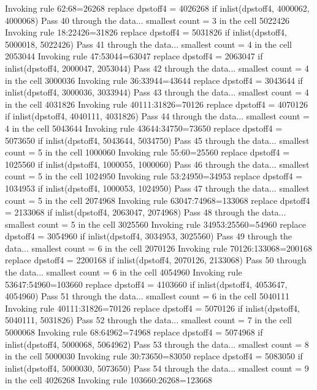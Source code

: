   Invoking rule 62:68=26268
  replace dpstoff4 = 4026268 if inlist(dpstoff4, 4000062, 4000068)
Pass 40 through the data...
  smallest count = 3 in the cell      5022426
  Invoking rule 18:22426=31826
  replace dpstoff4 = 5031826 if inlist(dpstoff4, 5000018, 5022426)
Pass 41 through the data...
  smallest count = 4 in the cell      2053044
  Invoking rule 47:53044=63047
  replace dpstoff4 = 2063047 if inlist(dpstoff4, 2000047, 2053044)
Pass 42 through the data...
  smallest count = 4 in the cell      3000036
  Invoking rule 36:33944=43644
  replace dpstoff4 = 3043644 if inlist(dpstoff4, 3000036, 3033944)
Pass 43 through the data...
  smallest count = 4 in the cell      4031826
  Invoking rule 40111:31826=70126
  replace dpstoff4 = 4070126 if inlist(dpstoff4, 4040111, 4031826)
Pass 44 through the data...
  smallest count = 4 in the cell      5043644
  Invoking rule 43644:34750=73650
  replace dpstoff4 = 5073650 if inlist(dpstoff4, 5043644, 5034750)
Pass 45 through the data...
  smallest count = 5 in the cell      1000060
  Invoking rule 55:60=25560
  replace dpstoff4 = 1025560 if inlist(dpstoff4, 1000055, 1000060)
Pass 46 through the data...
  smallest count = 5 in the cell      1024950
  Invoking rule 53:24950=34953
  replace dpstoff4 = 1034953 if inlist(dpstoff4, 1000053, 1024950)
Pass 47 through the data...
  smallest count = 5 in the cell      2074968
  Invoking rule 63047:74968=133068
  replace dpstoff4 = 2133068 if inlist(dpstoff4, 2063047, 2074968)
Pass 48 through the data...
  smallest count = 5 in the cell      3025560
  Invoking rule 34953:25560=54960
  replace dpstoff4 = 3054960 if inlist(dpstoff4, 3034953, 3025560)
Pass 49 through the data...
  smallest count = 6 in the cell      2070126
  Invoking rule 70126:133068=200168
  replace dpstoff4 = 2200168 if inlist(dpstoff4, 2070126, 2133068)
Pass 50 through the data...
  smallest count = 6 in the cell      4054960
  Invoking rule 53647:54960=103660
  replace dpstoff4 = 4103660 if inlist(dpstoff4, 4053647, 4054960)
Pass 51 through the data...
  smallest count = 6 in the cell      5040111
  Invoking rule 40111:31826=70126
  replace dpstoff4 = 5070126 if inlist(dpstoff4, 5040111, 5031826)
Pass 52 through the data...
  smallest count = 7 in the cell      5000068
  Invoking rule 68:64962=74968
  replace dpstoff4 = 5074968 if inlist(dpstoff4, 5000068, 5064962)
Pass 53 through the data...
  smallest count = 8 in the cell      5000030
  Invoking rule 30:73650=83050
  replace dpstoff4 = 5083050 if inlist(dpstoff4, 5000030, 5073650)
Pass 54 through the data...
  smallest count = 9 in the cell      4026268
  Invoking rule 103660:26268=123668
